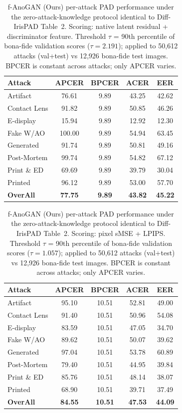 \begin{table}[t]
\centering
\small
\caption{f-AnoGAN (Ours) per-attack PAD performance under the zero-attack-knowledge protocol identical to Diff-IrisPAD Table~2. Scoring: native latent residual + discriminator feature. Threshold $\tau$ = 90th percentile of bona-fide validation scores ($\tau{=}2.191$); applied to 50{,}612 attacks (val+test) vs 12{,}926 bona-fide test images. BPCER is constant across attacks; only APCER varies.}
\label{tab:fanogan_fanoganscore}
\begin{tabular}{l|cccc}
\toprule
Attack & APCER & BPCER & ACER & EER \\
\midrule
Artifact & 76.61 & 9.89 & 43.25 & 42.62 \\
Contact Lens & 91.82 & 9.89 & 50.85 & 46.26 \\
E-display & 15.94 & 9.89 & 12.92 & 12.30 \\
Fake W/AO & 100.00 & 9.89 & 54.94 & 63.45 \\
Generated & 91.74 & 9.89 & 50.81 & 49.16 \\
Post-Mortem & 99.74 & 9.89 & 54.82 & 67.12 \\
Print \& ED & 69.69 & 9.89 & 39.79 & 30.04 \\
Printed & 96.12 & 9.89 & 53.00 & 57.70 \\
\midrule
\textbf{OverAll} & \textbf{77.75} & \textbf{9.89} & \textbf{43.82} & \textbf{45.22} \\
\bottomrule
\end{tabular}
\end{table}

\begin{table}[t]
\centering
\small
\caption{f-AnoGAN (Ours) per-attack PAD performance under the zero-attack-knowledge protocol identical to Diff-IrisPAD Table~2. Scoring: pixel sMSE + LPIPS. Threshold $\tau$ = 90th percentile of bona-fide validation scores ($\tau{=}1.057$); applied to 50{,}612 attacks (val+test) vs 12{,}926 bona-fide test images. BPCER is constant across attacks; only APCER varies.}
\label{tab:fanogan_reconscore}
\begin{tabular}{l|cccc}
\toprule
Attack & APCER & BPCER & ACER & EER \\
\midrule
Artifact & 95.10 & 10.51 & 52.81 & 49.00 \\
Contact Lens & 91.40 & 10.51 & 50.96 & 54.08 \\
E-display & 83.59 & 10.51 & 47.05 & 34.70 \\
Fake W/AO & 89.62 & 10.51 & 50.07 & 39.62 \\
Generated & 97.04 & 10.51 & 53.78 & 60.89 \\
Post-Mortem & 79.40 & 10.51 & 44.95 & 39.84 \\
Print \& ED & 85.76 & 10.51 & 48.14 & 38.07 \\
Printed & 68.90 & 10.51 & 39.71 & 37.49 \\
\midrule
\textbf{OverAll} & \textbf{84.55} & \textbf{10.51} & \textbf{47.53} & \textbf{44.09} \\
\bottomrule
\end{tabular}
\end{table}


